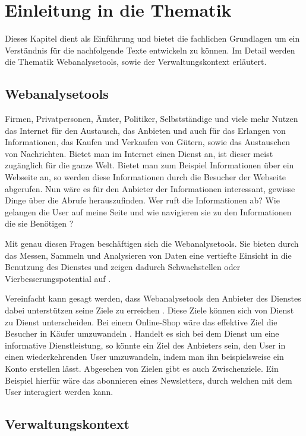 \section{Einleitung in die Thematik}
Dieses Kapitel dient als Einführung und bietet die fachlichen Grundlagen um ein Verständnis für die nachfolgende Texte entwickeln zu können. Im Detail werden die Thematik Webanalysetools, sowie der Verwaltungskontext erläutert.

\subsection{Webanalysetools}
Firmen, Privatpersonen, Ämter, Politiker, Selbstständige und viele mehr Nutzen das Internet für den Austausch, das Anbieten und auch für das Erlangen von Informationen, das Kaufen und Verkaufen von Gütern, sowie das Austauschen von Nachrichten. Bietet man im Internet einen Dienst an, ist dieser meist zugänglich für die ganze Welt. Bietet man zum Beispiel Informationen über ein Webseite an, so werden diese Informationen durch die Besucher der Webseite abgerufen. Nun wäre es für den Anbieter der Informationen interessant, gewisse Dinge über die Abrufe herauszufinden. Wer ruft die Informationen ab? Wie gelangen die User auf meine Seite und wie navigieren sie zu den Informationen die sie Benötigen \parencite[S. 175]{nakatani2011toolselectionmethod}?

Mit genau diesen Fragen beschäftigen sich die Webanalysetools. Sie bieten durch das Messen, Sammeln und Analysieren von Daten eine vertiefte Einsicht in die Benutzung des Dienstes und zeigen dadurch Schwachstellen oder Vierbesserungspotential auf \parencite[S. 1]{waisberg2009webShort}. 

Vereinfacht kann gesagt werden, dass Webanalysetools den Anbieter des Dienstes dabei unterstützen seine Ziele zu erreichen \parencite[S. 56]{AnalyticsForDummies}. Diese Ziele können sich von Dienst zu Dienst unterscheiden. Bei einem Online-Shop wäre das effektive Ziel die Besucher in Käufer umzuwandeln \parencite[S. 28]{AnalyticsForDummies}. Handelt es sich bei dem Dienst um eine informative Dienstleistung, so könnte ein Ziel des Anbieters sein, den User in einen wiederkehrenden User umzuwandeln, indem man ihn beispielsweise ein Konto erstellen lässt. Abgesehen von Zielen gibt es auch Zwischenziele. Ein Beispiel hierfür wäre das abonnieren eines Newsletters, durch welchen mit dem User interagiert werden kann. 



\subsection{Verwaltungskontext}

